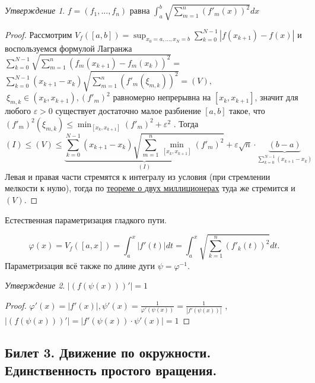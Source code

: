 \documentclass[a4paper]{article}
\theoremstyle{indented}
\theoremstyle{definition}
\theoremstyle{remark}
\newtheorem{stat}{Утверждение}
\begin{document}
\begin{stat}
    $f=(f_1, ..., f_n)$ равна $\displaystyle \int_{a}^{b}{\sqrt{\sum\limits_{m=1}^{n}(f'_m(x))^2}} dx$
\end{stat}

\begin{proof}
    Рассмотрим $V_f([a,b]) = \displaystyle \sup_{x_0=a, ..., x_N = b} \sum\limits_{k=0}^{N-1} |f(x_{k+1})-f(x)|$ и 
    воспользуемся формулой Лагранжа $\sum\limits_{k=0}^{N-1} \sqrt{\sum\limits_{m=1}^{n}(f_m(x_{k+1})-f_m(x_k))^2} = $
    $\sum\limits_{k=0}^{N-1} (x_{k+1}-x_k) \sqrt{\sum\limits_{m=1}^{n} (f'_m(\xi_{m,k}))^2}=(V),$
    $\ \xi_{m,k} \in (x_k,x_{k+1}), (f'_m)^2$ равномерно непрерывна на $[x_k, x_{k+1}]$, значит для любого $\varepsilon > 0$ 
    существует достаточно малое разбиение $[a,b]$ такое, что 
    $(f'_m)^2(\xi_{m,k}) \leq \min_{[x_k, x_{k+1}]} (f'_m)^2 + \varepsilon^2$ . Тогда
    \[  (I) \leq (V) \leq \underbrace{\sum\limits_{k=0}^{N-1} (x_{k+1}-x_k) \sqrt{\sum\limits_{m=1}^{n} \min_{[x_k, x_{k+1}]} (f'_m)^2}}_{(I)} 
    +  \varepsilon \sqrt{n} \cdot \underbrace{(b-a)}_{\sum\limits_{k=0}^{N-1} (x_{k+1}-x_k)} \]
    Левая и правая части стремятся к интегралу из условия (при стремлении 
    мелкости к нулю), тогда по \href{https://ru.wikipedia.org/wiki/%D0%A2%D0%B5%D0%BE%D1%80%D0%B5%D0%BC%D0%B0_%D0%BE_%D0%B4%D0%B2%D1%83%D1%85_%D0%BC%D0%B8%D0%BB%D0%B8%D1%86%D0%B8%D0%BE%D0%BD%D0%B5%D1%80%D0%B0%D1%85}
    {теореме о двух миллиционерах} туда же стремится и $(V)$.
\end{proof}

Естественная параметризация гладкого пути. 

$$\displaystyle \varphi(x)=V_f([a,x])=\int_{a}^{x} |f'(t)| dt = \int_{a}^{x}{\sqrt{\sum\limits_{k=1}^{n}(f'_k(t))^2}} dt.$$
Параметризация всё также по длине дуги $\psi = \varphi^{-1}$. 
\begin{stat}
    $|(f(\psi(x)))'|=1$
\end{stat}

\begin{proof}
    $\varphi'(x)=|f'(x)|, \psi'(x)=\frac{1}{\varphi'(\psi(x))}=\frac{1}{|f'(\psi(x))|}$ , $|(f(\psi(x)))'|=|f'(\psi(x))\cdot\psi'(x)|=1$
\end{proof}

\subsection{Билет 3. Движение по окружности. Единственность простого вращения.}
\end{document}
